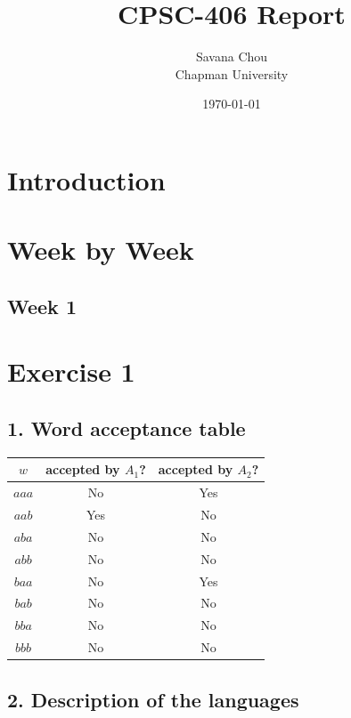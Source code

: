 \documentclass{article}
\title{CPSC-406 Report}
\author{Savana Chou  \\ Chapman University}
\date{\today}
\theoremstyle{theorem}
\theoremstyle{definition}
\theoremstyle{remark}
\begin{document}
\maketitle

\begin{abstract}
\end{abstract}

\setcounter{tocdepth}{3}
\tableofcontents

\section{Introduction}\label{intro}

\section{Week by Week}\label{homework}

\subsection{Week 1}

\section*{Exercise 1}

\subsection*{1. Word acceptance table}

\begin{center}
\begin{tabular}{c|c|c}
$w$ & accepted by $A_1$? & accepted by $A_2$? \\
\hline
$aaa$ & No & Yes \\
$aab$ & Yes & No \\
$aba$ & No & No \\
$abb$ & No & No \\
$baa$ & No & Yes \\
$bab$ & No & No \\
$bba$ & No & No \\
$bbb$ & No & No \\
\end{tabular}
\end{center}

\subsection*{2. Description of the languages}
\end{document}
